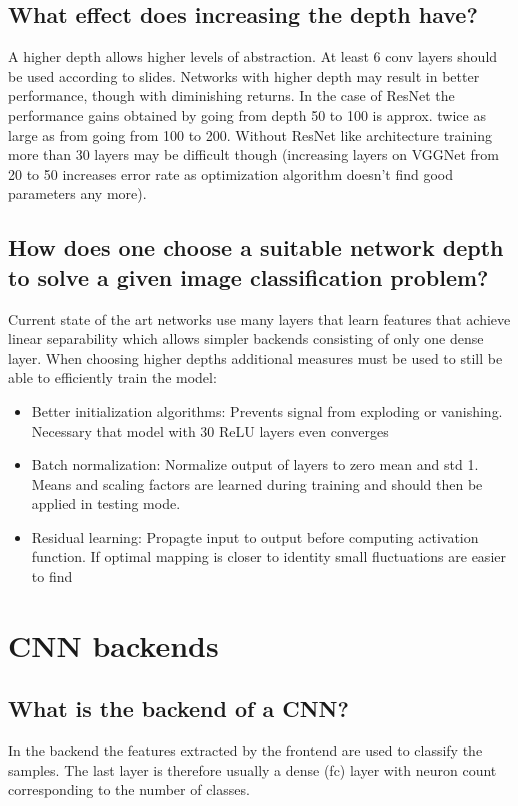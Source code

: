 \subsection{What effect does increasing the depth have?}
A higher depth allows higher levels of abstraction. At least $6$ conv layers should be used according to slides. Networks with higher depth may result in better performance, though with diminishing returns. In the case of ResNet the performance gains obtained by going from depth 50 to 100 is approx. twice as large as from going from 100 to 200. Without ResNet like architecture training more than 30 layers may be difficult though (increasing layers on VGGNet from 20 to 50 increases error rate as optimization algorithm doesn't find good parameters any more).
\subsection{How does one choose a suitable network depth to solve a given image classification problem?}
Current state of the art networks use many layers that learn features that achieve linear separability which allows simpler backends consisting of only one dense layer. When choosing higher depths additional measures must be used to still be able to efficiently train the model:
\begin{itemize}
\item Better initialization algorithms: Prevents signal from exploding or vanishing. Necessary that model with 30 ReLU layers even converges
\item Batch normalization: Normalize output of layers to zero mean and std 1. Means and scaling factors are learned during training and should then be applied in testing mode. 
\item Residual learning: Propagte input to output before computing activation function. If optimal mapping is closer to identity small fluctuations are easier to find
\end{itemize}
%
\section{CNN backends}
\subsection{What is the backend of a CNN?}
In the backend the features extracted by the frontend are used to classify the samples. The last layer is therefore usually a dense (fc) layer with neuron count corresponding to the number of classes. 
